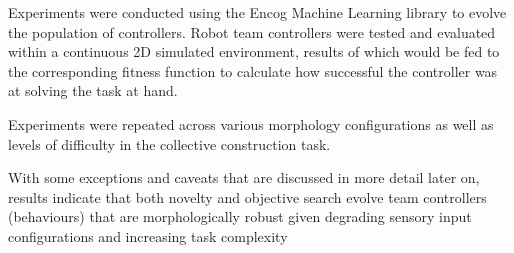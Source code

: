 Experiments were conducted using the Encog Machine Learning library to evolve the population of controllers. Robot team controllers were tested and evaluated within a continuous 2D simulated environment, results of which would be fed to the corresponding fitness function to calculate how successful the controller was at solving the task at hand.

Experiments were repeated across various morphology configurations as well as levels of difficulty in the collective construction task.

With some exceptions and caveats that are discussed in more detail later on, results indicate that both novelty and objective search evolve team controllers (behaviours) that are morphologically robust given degrading sensory input configurations and increasing task complexity
